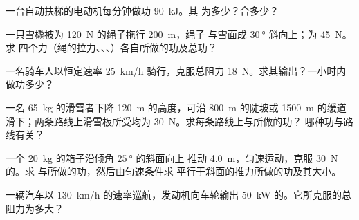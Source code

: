 \begin{exercise}[$\star$]\label{exo:g11:work-of-force:5}
一台自动扶梯的电动机每分钟做功 \qty{90}{kJ}。其
为多少？合多少？
\end{exercise}

\begin{exercise}[$\star\star$]\label{exo:g11:work-of-force:6}
一只雪橇被为 \qty{120}{N} 的绳子拖行 \qty{200}{m}，绳子
与雪面成 $\qty{30}{\degree}$ 斜向上；为 \qty{45}{N}。求
四个力（绳的拉力、、、）各自所做的功及总功？
\end{exercise}

\begin{exercise}[$\star\star$]\label{exo:g11:work-of-force:7}
一名骑车人以恒定速率 \qty{25}{km/h} 骑行，克服总阻力
\qty{18}{N}。求其输出？一小时内做功多少？
\end{exercise}

\begin{exercise}[$\star\star$]\label{exo:g11:work-of-force:8}
一名 \qty{65}{kg} 的滑雪者下降 \qty{120}{m} 的高度，可沿 \qty{800}{m}
的陡坡或 \qty{1500}{m} 的缓道滑下；两条路线上滑雪板所受均为
\qty{30}{N}。求每条路线上与所做的功？
哪种功与路线有关？
\end{exercise}

\begin{exercise}[$\star\star$]\label{exo:g11:work-of-force:9}
一个 \qty{20}{kg} 的箱子沿倾角 $\qty{25}{\degree}$ 的斜面向上
推动 \qty{4.0}{m}，匀速运动，克服 \qty{30}{N} 的。求
与所做的功，然后由匀速条件求
平行于斜面的推力所做的功及其大小。
\end{exercise}

\begin{exercise}[$\star\star$]\label{exo:g11:work-of-force:10}
一辆汽车以 \qty{130}{km/h} 的速率巡航，发动机向车轮输出
\qty{50}{kW} 的。它所克服的总阻力为多大？
\end{exercise}

